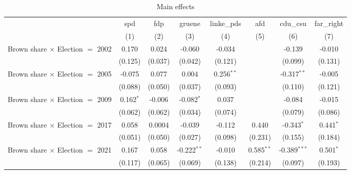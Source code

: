 
\begin{table}[htbp]
   \caption{Main effects}
   \centering
   \begin{tabular}{lccccccc}
      \tabularnewline \midrule \midrule
                                                              & spd           & fdp          & gruene         & linke\_pds    & afd            & cdu\_csu       & far\_right\\   
                                                              & (1)           & (2)          & (3)            & (4)           & (5)            & (6)            & (7)\\  
      Brown share $\times$ Election $=$ 2002                  & 0.170         & 0.024        & -0.060         & -0.034        &                & -0.139         & -0.010\\   
                                                              & (0.125)       & (0.037)      & (0.042)        & (0.121)       &                & (0.099)        & (0.131)\\   
      Brown share $\times$ Election $=$ 2005                  & -0.075        & 0.077        & 0.004          & 0.256$^{**}$  &                & -0.317$^{**}$  & -0.005\\   
                                                              & (0.088)       & (0.050)      & (0.037)        & (0.093)       &                & (0.110)        & (0.121)\\   
      Brown share $\times$ Election $=$ 2009                  & 0.162$^{*}$   & -0.006       & -0.082$^{*}$   & 0.037         &                & -0.084         & -0.015\\   
                                                              & (0.062)       & (0.062)      & (0.034)        & (0.074)       &                & (0.079)        & (0.086)\\   
      Brown share $\times$ Election $=$ 2017                  & 0.058         & 0.0004       & -0.039         & -0.112        & 0.440          & -0.343$^{*}$   & 0.441$^{*}$\\   
                                                              & (0.051)       & (0.050)      & (0.027)        & (0.098)       & (0.231)        & (0.155)        & (0.184)\\   
      Brown share $\times$ Election $=$ 2021                  & 0.167         & 0.058        & -0.222$^{**}$  & -0.010        & 0.585$^{**}$   & -0.389$^{***}$ & 0.501$^{*}$\\   
                                                              & (0.117)       & (0.065)      & (0.069)        & (0.138)       & (0.214)        & (0.097)        & (0.193)\\   

\end{tabular}
\end{table}
